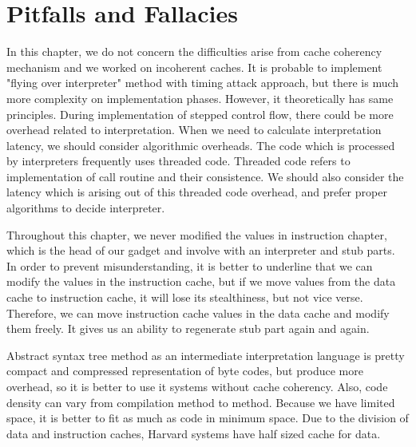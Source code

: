\section{Pitfalls and Fallacies}
	In this chapter, we do not concern the difficulties arise from cache coherency mechanism and we worked on incoherent caches. It is probable to implement "flying over interpreter" method with timing attack approach, but there is much more complexity on implementation phases. However, it theoretically has same principles. During implementation of stepped control flow, there could be more overhead related to interpretation. When we need to calculate interpretation latency, we should consider algorithmic overheads. The code which is processed by interpreters frequently uses threaded code. Threaded code refers to implementation of call routine and their consistence. We should also consider the latency which is arising out of this threaded code overhead, and prefer proper algorithms to decide interpreter. 

	Throughout this chapter, we never modified the values in instruction chapter, which is the head of our gadget and involve with an interpreter and stub parts. In order to prevent misunderstanding, it is better to underline that we can modify the values in the instruction cache, but if we move values from the data cache to instruction cache, it will lose its stealthiness, but not vice verse. Therefore, we can move instruction cache values in the data cache and modify them freely. It gives us an ability to regenerate stub part again and again.

	Abstract syntax tree method as an intermediate interpretation language is pretty compact and compressed representation of byte codes\cite{kistler1999tree}, but produce more overhead\cite{garen2008announcing}, so it is better to use it systems without cache coherency. Also, code density can vary from compilation method to method. Because we have limited space, it is better to fit as much as code in minimum space. Due to the division of data and instruction caches, Harvard systems have half sized cache for data.

